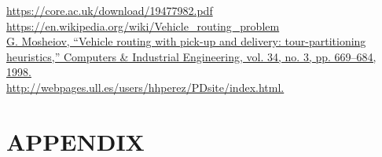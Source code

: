 \documentclass[conference]{IEEEtran}
\begin{document}
\begin{thebibliography}{00}
\bibitem{} \url{https://core.ac.uk/download/19477982.pdf}\\
\bibitem{} \url{https://en.wikipedia.org/wiki/Vehicle_routing_problem}\\

\bibitem{} \url{G. Mosheiov, “Vehicle routing with pick-up and delivery: tour-partitioning heuristics,” Computers & Industrial Engineering, vol. 34, no. 3, pp. 669–684, 1998.}   \\
\bibitem{} \url{ http://webpages.ull.es/users/hhperez/PDsite/index.html.}   \\
\end{thebibliography}  

\vspace{12pt}

\section{{\textbf{APPENDIX}}}
\end{document}
